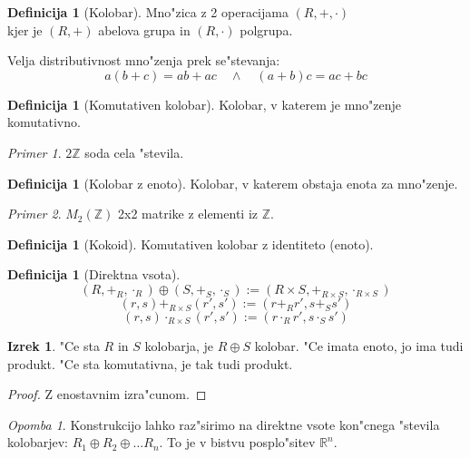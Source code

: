 \documentclass[11pt, a4paper]{article}
\theoremstyle{definition}
\newtheorem{defn}[counter]{Definicija}
\newtheorem{theorem}[counter]{Izrek}
\theoremstyle{remark}
\newtheorem*{ex}{Primer}
\newtheorem*{rem}{Opomba}
\newcommand{\Z}{\mathbb{Z}}
\newcommand{\R}{\mathbb{R}}
\begin{document}
	\begin{defn}[Kolobar]
		Mno"zica z 2 operacijama $(R, +, \cdot)$ \\
		kjer je $(R, +)$ abelova grupa in $(R, \cdot)$ polgrupa.
		
		Velja distributivnost mno"zenja prek se"stevanja:
		\[ a(b+c) = ab + ac \quad \land \quad (a+b)c = ac + bc \]
	\end{defn}
	
	\begin{defn}[Komutativen kolobar]
		Kolobar, v katerem je mno"zenje komutativno.
	\end{defn}
	\begin{ex}
		$2\Z$ soda cela "stevila.
	\end{ex}
	\begin{defn}[Kolobar z enoto]
		Kolobar, v katerem obstaja enota za mno"zenje.
	\end{defn}
	\begin{ex}
		$M_2(\Z)$ 2x2 matrike z elementi iz $\Z$.
	\end{ex}
	\begin{defn}[Kokoid]
		Komutativen kolobar z identiteto (enoto).
	\end{defn}

	\begin{defn}[Direktna vsota]
		\[ (R, +_{R}, \cdot_{R}) \oplus (S, +_{S}, \cdot_{S}) := (R \times S, +_{R \times S}, \cdot_{R \times S}) \]
		\[ (r,s) +_{R \times S} (r',s') := (r+_{R}r', s+_{S}s') \]
		\[ (r,s) \cdot_{R \times S} (r',s') := (r \cdot_{R} r', s \cdot_{S} s') \]
	\end{defn}
	\begin{theorem}
		"Ce sta $R$ in $S$ kolobarja, je $R \oplus S$ kolobar. "Ce imata enoto, jo ima tudi produkt. "Ce sta komutativna, je tak tudi produkt.
	\end{theorem}
	\begin{proof}
		Z enostavnim izra"cunom.
	\end{proof}
	
	\begin{rem}
		Konstrukcijo lahko raz"sirimo na direktne vsote kon"cnega "stevila kolobarjev: $R_1 \oplus R_2 \oplus \ldots R_n$.
		To je v bistvu posplo"sitev $\R^n$.
	\end{rem}
	
\end{document}
